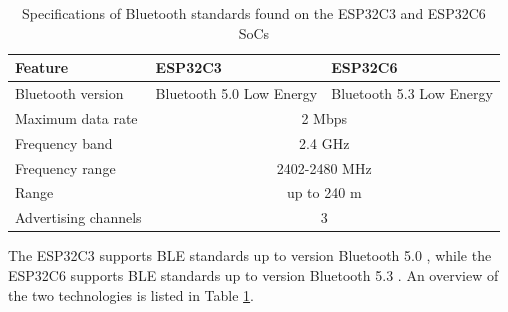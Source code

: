 \begin{table}[H]
    \centering
    \begin{tabular}{|l|l|l|}
        \hline
        \textbf{Feature} & \textbf{ESP32C3} & \textbf{ESP32C6} \\\hline
        Bluetooth version & Bluetooth 5.0 Low Energy & Bluetooth 5.3 Low Energy \\\hline
        Maximum data rate & \multicolumn{2}{c|}{2 Mbps} \\\hline
        Frequency band & \multicolumn{2}{c|}{2.4 GHz} \\\hline
        Frequency range & \multicolumn{2}{c|}{2402-2480 MHz} \\\hline
        Range & \multicolumn{2}{c|}{up to 240 m} \\\hline
        Advertising channels & \multicolumn{2}{c|}{3} \\\hline
    \end{tabular}
    \vspace{\ftspace}
    \caption{Specifications of Bluetooth standards found on the ESP32C3 and ESP32C6 SoCs \citep{noauthor_bluetooth_2024-1, noauthor_bluetooth_2024-2}}
    \label{tab:esp_bluetooth}
\end{table}
The ESP32C3 supports BLE standards up to version Bluetooth 5.0 \citep{espressif_systems_esp32-c3_2024, seeed_studio_seeed_2024-2, noauthor_bluetooth_2024-2}, while the ESP32C6 supports BLE standards up to version Bluetooth 5.3 \citep{espressif_systems_esp32-c6_2024, seeed_studio_seeed_2024-1, noauthor_bluetooth_2024-1}. An overview of the two technologies is listed in Table \ref{tab:esp_bluetooth}.\\

